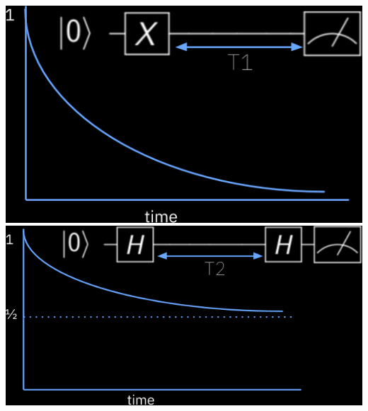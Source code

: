 \documentclass[aspectratio=169,11pt,hyperref={colorlinks=true}]{beamer}
\begin{document}
\begin{frame}
\begin{columns}
{                \includegraphics[width=\textwidth]{decoherence_t1.png}
                \includegraphics[width=\textwidth]{decoherence_t2.png}
            }
    \end{columns}
\end{frame}
\end{document}
